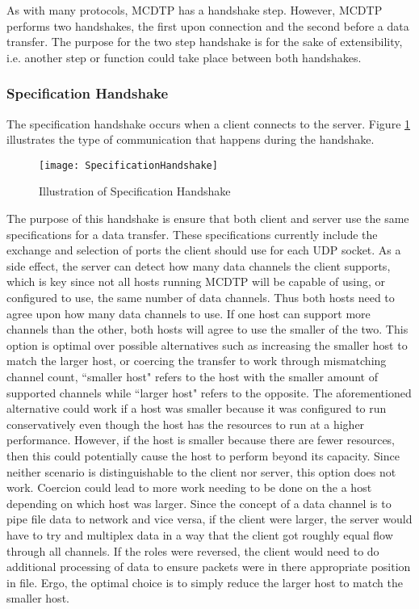 As with many protocols, MCDTP has a handshake step. However, MCDTP performs two handshakes, the first upon connection and the second before a data transfer. The purpose for the two step handshake is for the sake of extensibility, i.e. another step or function could take place between both handshakes.

\subsubsection{Specification Handshake}

The specification handshake occurs when a client connects to the server. Figure \ref{fig:specs} illustrates the type of communication that happens during the handshake.

\begin{figure}[ht]
\centering
\texttt{[image: SpecificationHandshake]}
\caption{Illustration of Specification Handshake}
\label{fig:specs}
\end{figure}

The purpose of this handshake is ensure that both client and server use the same specifications for a data transfer. These specifications currently include the exchange and selection of ports the client should use for each UDP socket. As a side effect, the server can detect how many data channels the client supports, which is key since not all hosts running MCDTP will be capable of using, or configured to use, the same number of data channels. Thus both hosts need to agree upon how many data channels to use. If one host can support more channels than the other, both hosts will agree to use the smaller of the two. This option is optimal over possible alternatives such as increasing the smaller host to match the larger host, or coercing the transfer to work through mismatching channel count, ``smaller host" refers to the host with the smaller amount of supported channels while ``larger host" refers to the opposite. The aforementioned alternative could work if a host was smaller because it was configured to run conservatively even though the host has the resources to run at a higher performance. However, if the host is smaller because there are fewer resources, then this could potentially cause the host to perform beyond its capacity. Since neither scenario is distinguishable to the client nor server, this option does not work. Coercion could lead to more work needing to be done on the a host depending on which host was larger. Since the concept of a data channel is to pipe file data to network and vice versa, if the client were larger, the server would have to try and multiplex data in a way that the client got roughly equal flow through all channels. If the roles were reversed, the client would need to do additional processing of data to ensure packets were in there appropriate position in file. Ergo, the optimal choice is to simply reduce the larger host to match the smaller host.

